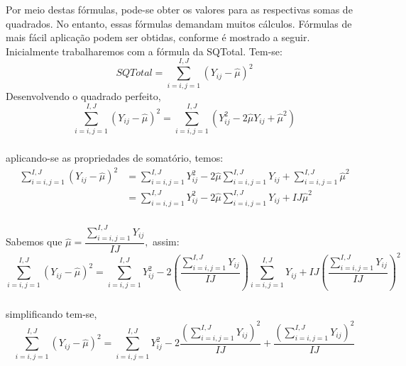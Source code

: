 \documentclass[14pt,aspectratio=1610]{beamer}
\begin{document}
\begin{frame}{}
\frametitle{}
\begin{block}{}
\justifying
Por meio destas fórmulas, pode-se obter os valores para as respectivas somas de quadrados. No entanto, essas fórmulas demandam muitos cálculos. Fórmulas de mais fácil aplicação podem ser obtidas, conforme é mostrado a seguir. Inicialmente trabalharemos com a fórmula da SQTotal. Tem-se:
$$SQTotal={\displaystyle \sum_{i=i,j=1}^{I,J}(Y_{ij}-\hat{\mu})^{2}}$$\pause
Desenvolvendo o quadrado perfeito,
$${\displaystyle \sum_{i=i,j=1}^{I,J}(Y_{ij}-\hat{\mu})^{2}=\sum_{i=i,j=1}^{I,J}(Y_{ij}^{2}-2\hat{\mu}Y_{ij}+\hat{\mu}^{2})}$$
\end{block}
\end{frame}

\begin{frame}{}
\frametitle{}
\begin{block}{}
\justifying
aplicando-se as propriedades de somatório, temos:
\begin{align}
{\displaystyle \sum_{i=i,j=1}^{I,J}(Y_{ij}-\hat{\mu})^{2}}&=
{\displaystyle \sum_{i=i,j=1}^{I,J}Y_{ij}^{2}-2\hat{\mu}\sum_{i=i,j=1}^{I,J}Y_{ij}+\sum_{i=i,j=1}^{I,J}\hat{\mu}^{2}}\\
&={\displaystyle \sum_{i=i,j=1}^{I,J}Y_{ij}^{2}-2\hat{\mu}\sum_{i=i,j=1}^{I,J}Y_{ij}+IJ\hat{\mu}^{2}}
\end{align}
\end{block}
\end{frame}

\begin{frame}{}
\frametitle{}
\begin{block}{}
\justifying
Sabemos que $\hat{\mu}=\dfrac{{\displaystyle \sum_{i=i,j=1}^{I,J}Y_{ij}}}{IJ},$ assim:
$$
{\displaystyle \sum_{i=i,j=1}^{I,J}(Y_{ij}-\hat{\mu})^{2}}=
{\displaystyle \sum_{i=i,j=1}^{I,J}Y_{ij}^{2}-2\left(\dfrac{{\displaystyle \sum_{i=i,j=1}^{I,J}Y_{ij}}}{IJ}\right)\sum_{i=i,j=1}^{I,J}Y_{ij}+IJ\left(\dfrac{{\displaystyle \sum_{i=i,j=1}^{I,J}Y_{ij}}}{IJ}\right)^{2}}
$$
\end{block}
\end{frame}

\begin{frame}{}
\frametitle{}
\begin{block}{}
\justifying
simplificando tem-se,
$$
{\displaystyle \sum_{i=i,j=1}^{I,J}(Y_{ij}-\hat{\mu})^{2}}=
{\displaystyle \sum_{i=i,j=1}^{I,J}Y_{ij}^{2}-2\dfrac{\left({\displaystyle \sum_{i=i,j=1}^{I,J}Y_{ij}}\right)^{2}}{IJ}+\dfrac{\left({\displaystyle \sum_{i=i,j=1}^{I,J}Y_{ij}}\right)^{2}}{IJ}}
$$
\end{block}
\end{frame}
\end{document}
